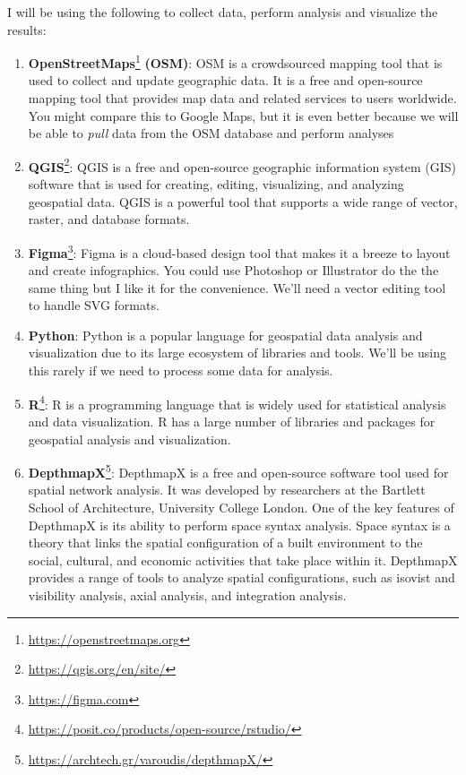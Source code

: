 \documentclass[
]{latex/krantz}
\renewcommand{\href}[2]{#2\footnote{\url{#1}}}
\DeclareRobustCommand{\href}[2]{#2\footnote{\url{#1}}}
\begin{document}
I will be using the following to collect data, perform analysis and visualize the results:

\begin{enumerate}
\def\labelenumi{\arabic{enumi}.}
\item
  \href{https://openstreetmaps.org}{\textbf{OpenStreetMaps}} \textbf{(OSM)}: OSM is a crowdsourced mapping tool that is used to collect and update geographic data. It is a free and open-source mapping tool that provides map data and related services to users worldwide. You might compare this to Google Maps, but it is even better because we will be able to \emph{pull} data from the OSM database and perform analyses
\item
  \href{https://qgis.org/en/site/}{\textbf{QGIS}}: QGIS is a free and open-source geographic information system (GIS) software that is used for creating, editing, visualizing, and analyzing geospatial data. QGIS is a powerful tool that supports a wide range of vector, raster, and database formats.
\item
  \href{https://figma.com}{\textbf{Figma}}: Figma is a cloud-based design tool that makes it a breeze to layout and create infographics. You could use Photoshop or Illustrator do the the same thing but I like it for the convenience. We'll need a vector editing tool to handle SVG formats.
\item
  \textbf{Python}: Python is a popular language for geospatial data analysis and visualization due to its large ecosystem of libraries and tools. We'll be using this rarely if we need to process some data for analysis.
\item
  \href{https://posit.co/products/open-source/rstudio/}{\textbf{R}}: R is a programming language that is widely used for statistical analysis and data visualization. R has a large number of libraries and packages for geospatial analysis and visualization.
\item
  \href{https://archtech.gr/varoudis/depthmapX/}{\textbf{DepthmapX}}: DepthmapX is a free and open-source software tool used for spatial network analysis. It was developed by researchers at the Bartlett School of Architecture, University College London. One of the key features of DepthmapX is its ability to perform space syntax analysis. Space syntax is a theory that links the spatial configuration of a built environment to the social, cultural, and economic activities that take place within it. DepthmapX provides a range of tools to analyze spatial configurations, such as isovist and visibility analysis, axial analysis, and integration analysis.
\end{enumerate}
\end{document}
